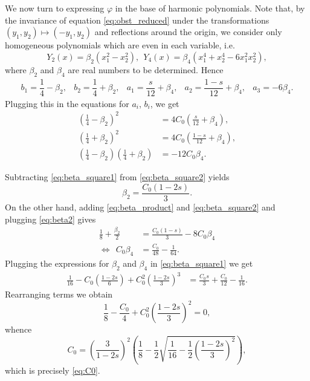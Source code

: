\documentclass[10pt,a4paper]{article}
\numberwithin{equation}{section}
\begin{document}
We now turn to expressing $\varphi$ in the base of harmonic polynomials. Note that, by the invariance of equation \eqref{eq:obst_reduced} under the transformations $(y_1, y_2) \mapsto (-y_1 ,y_2) $ and reflections around the origin, we consider only homogeneous polynomials which are even in each variable, i.e.
\[Y_2 (x) = \beta_2(x_1^2 -x_2^2),~~ Y_4(x) = \beta_4(x_1^4 + x_2^4 -6x_1^2x_2^2),\]
where $ \beta_2 $ and $ \beta_4 $ are real numbers to be determined. Hence 
\[
	\begin{array}{ccccc}	
		b_1 = \dfrac{1}{4} - \beta_2, & b_2 = \dfrac{1}{4} + \beta_2, & a_1 = \dfrac{s}{12} + \beta_4, & a_2 = \dfrac{1-s}{12} + \beta_4, & a_3 = -6\beta_4.
	\end{array}
\]
Plugging this in the equations for $a_i$, $b_i$, we get
\begin{subequations}
\label{eq:beta_system}
\begin{align}
	\left( \frac{1}{4} - \beta_2 \right)^2 &= 4C_0\left( \frac{s}{12} + \beta_4\right), \label{eq:beta_square1}\\
	\left( \frac{1}{4} + \beta_2 \right)^2 &= 4C_0\left( \frac{1-s}{12} + \beta_4\right),  \label{eq:beta_square2}\\
	\left(\frac{1}{4} - \beta_2 \right) \left(\frac{1}{4} + \beta_2 \right) &= -12C_0\beta_4 \label{eq:beta_product}.
\end{align}
\end{subequations}

Subtracting \eqref{eq:beta_square1} from \eqref{eq:beta_square2} yields 
\begin{equation}
	\label{eq:beta2}
	\beta_2 =  \frac{C_0 \left(1-2s\right)}{3} . 
\end{equation}
On the other hand, adding \eqref{eq:beta_product} and \eqref{eq:beta_square2} and plugging \eqref{eq:beta2} gives
\begin{align*}
	\frac{1}{8} + \frac{\beta_2}{2} &= \frac{C_0 (1-s)}{3} - 8 C_0 \beta_4\\
 	\Leftrightarrow ~~ C_0 \beta_4 &= \frac{C_0}{48} - \frac{1}{64}.
\end{align*}
Plugging the expressions for $\beta_2$ and $\beta_4$ in \eqref{eq:beta_square1} we get
\begin{align*}
	\frac{1}{16} - C_0 \left( \frac{1-2s}{6} \right) + C_0^{2}\left( \frac{1-2s}{3} \right)^{3} &= \frac{C_0 s}{3} + \frac{C_0}{12} - \frac{1}{16}.
\end{align*}
Rearranging terms we obtain
\begin{equation}
\label{eq:quad_C0}
	\frac{1}{8} - \frac{C_0}{4} + C_0^{2}\left( \frac{1-2s}{3} \right)^{2} = 0,
\end{equation}
whence
\[
	C_0 = \left( \frac{3}{1-2s} \right)^{2} \left( \frac{1}{8} - \frac{1}{2}\sqrt{\frac{1}{16} - \frac{1}{2} \left( \frac{1-2s}{3} \right)^{2}} \right),
\]
which is precisely \eqref{eq:C0}.
\end{document}
